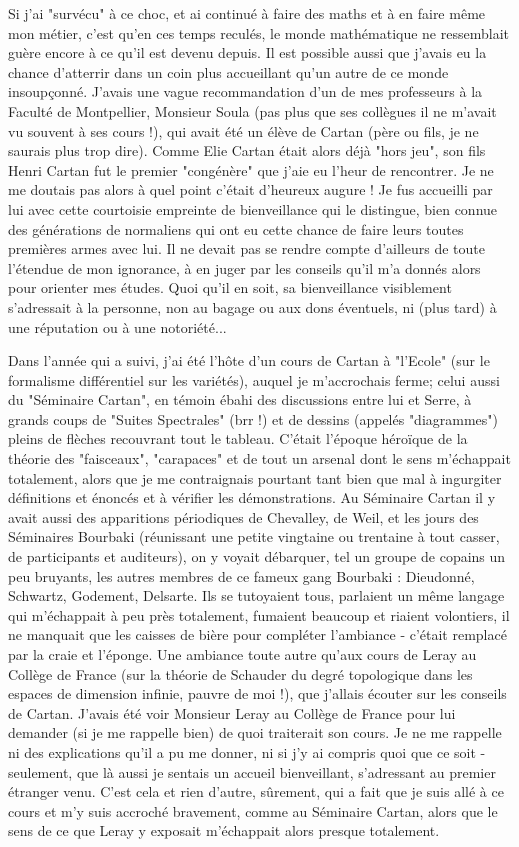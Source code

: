 Si j'ai "survécu" à ce choc, et ai continué à faire des maths et à en faire même mon métier, c'est qu'en ces temps reculés, le monde mathématique ne ressemblait guère encore à ce qu'il est devenu depuis. Il est possible aussi que j'avais eu la chance d'atterrir dans un coin plus accueillant qu'un autre de ce monde insoupçonné. J'avais une vague recommandation d'un de mes professeurs à la Faculté de Montpellier, Monsieur Soula (pas plus que ses collègues il ne m'avait vu souvent à ses cours !), qui avait été un élève de Cartan (père ou fils, je ne saurais plus trop dire). Comme Elie Cartan était alors déjà "hors jeu", son fils Henri Cartan fut le premier "congénère" que j'aie eu l'heur de rencontrer. Je ne me doutais pas alors à quel point c'était d'heureux augure ! Je fus accueilli par lui avec cette courtoisie empreinte de bienveillance qui le distingue, bien connue des générations de normaliens qui ont eu cette chance de faire leurs toutes premières armes avec lui. Il ne devait pas se rendre compte d'ailleurs de toute l'étendue de mon ignorance, à en juger par les conseils qu'il m'a donnés alors pour orienter mes études. Quoi qu'il en soit, sa bienveillance visiblement s'adressait à la personne, non au bagage ou aux dons éventuels, ni (plus tard) à une réputation ou à une notoriété...

Dans l'année qui a suivi, j'ai été l'hôte d'un cours de Cartan à "l'Ecole" (sur le formalisme différentiel sur les variétés), auquel je m'accrochais ferme; celui aussi du "Séminaire Cartan", en témoin ébahi des discussions entre lui et Serre, à grands coups de "Suites Spectrales" (brr !) et de dessins (appelés "diagrammes") pleins de flèches recouvrant tout le tableau. C'était l'époque héroïque de la théorie des "faisceaux", "carapaces" et de tout un arsenal dont le sens m'échappait totalement, alors que je me contraignais pourtant tant bien que mal à ingurgiter définitions et énoncés et à vérifier les démonstrations. Au Séminaire Cartan il y avait aussi des apparitions périodiques de Chevalley, de Weil, et les jours des Séminaires Bourbaki (réunissant une petite vingtaine ou trentaine à tout casser, de participants et auditeurs), on y voyait débarquer, tel un groupe de copains un peu bruyants, les autres membres de ce fameux gang Bourbaki : Dieudonné, Schwartz, Godement, Delsarte. Ils se tutoyaient tous, parlaient un même langage qui m'échappait à peu près totalement, fumaient beaucoup et riaient volontiers, il ne manquait que les caisses de bière pour compléter l'ambiance - c'était remplacé par la craie et l'éponge. Une ambiance toute autre qu'aux cours de Leray au Collège de France (sur la théorie de Schauder du degré topologique dans les espaces de dimension infinie, pauvre de moi !), que j'allais écouter sur les conseils de Cartan. J'avais été voir Monsieur Leray au Collège de France pour lui demander (si je me rappelle bien) de quoi traiterait son cours. Je ne me rappelle ni des explications qu'il a pu me donner, ni si j'y ai compris quoi que ce soit - seulement, que là aussi je sentais un accueil bienveillant, s'adressant au premier étranger venu. C'est cela et rien d'autre, sûrement, qui a fait que je suis allé à ce cours et m'y suis accroché bravement, comme au Séminaire Cartan, alors que le sens de ce que Leray y exposait m'échappait alors presque totalement.

